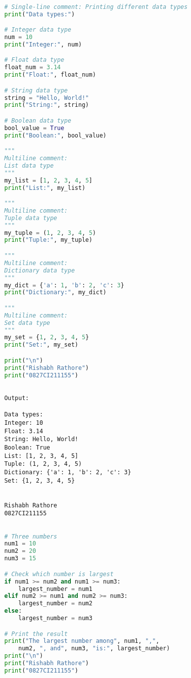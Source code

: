\documentclass{report}
\begin{document}
\begin{lstlisting}[language=Python]

	# Single-line comment: Printing different data types
	print("Data types:")

	# Integer data type
	num = 10
	print("Integer:", num)

	# Float data type
	float_num = 3.14
	print("Float:", float_num)

	# String data type
	string = "Hello, World!"
	print("String:", string)

	# Boolean data type
	bool_value = True
	print("Boolean:", bool_value)

	"""
	Multiline comment:
	List data type
	"""
	my_list = [1, 2, 3, 4, 5]
	print("List:", my_list)

	"""
	Multiline comment:
	Tuple data type
	"""
	my_tuple = (1, 2, 3, 4, 5)
	print("Tuple:", my_tuple)

	"""
	Multiline comment:
	Dictionary data type
	"""
	my_dict = {'a': 1, 'b': 2, 'c': 3}
	print("Dictionary:", my_dict)

	"""
	Multiline comment:
	Set data type
	"""
	my_set = {1, 2, 3, 4, 5}
	print("Set:", my_set)

	print("\n")
	print("Rishabh Rathore")
	print("0827CI211155")
\end{lstlisting}

\begin{verbatim}

	Output:

	Data types:
	Integer: 10
	Float: 3.14
	String: Hello, World!
	Boolean: True
	List: [1, 2, 3, 4, 5]
	Tuple: (1, 2, 3, 4, 5)
	Dictionary: {'a': 1, 'b': 2, 'c': 3}
	Set: {1, 2, 3, 4, 5}
	
	
	Rishabh Rathore
	0827CI211155
\end{verbatim}

\newpage


\sol{}

\begin{lstlisting}[language=Python]

	# Three numbers
	num1 = 10
	num2 = 20
	num3 = 15

	# Check which number is largest
	if num1 >= num2 and num1 >= num3:
		largest_number = num1
	elif num2 >= num1 and num2 >= num3:
		largest_number = num2
	else:
		largest_number = num3

	# Print the result
	print("The largest number among", num1, ",", 
		num2, ", and", num3, "is:", largest_number)
	print("\n")
	print("Rishabh Rathore")
	print("0827CI211155")
\end{lstlisting}
\end{document}
